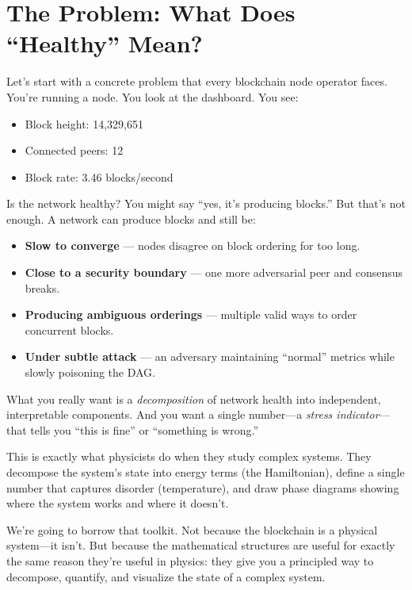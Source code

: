 \documentclass[11pt,a4paper]{article}
\begin{document}
\section{The Problem: What Does ``Healthy'' Mean?}

Let's start with a concrete problem that every blockchain node operator faces. You're running a node. You look at the dashboard. You see:

\begin{itemize}
    \item Block height: 14,329,651
    \item Connected peers: 12
    \item Block rate: 3.46 blocks/second
\end{itemize}

Is the network healthy? You might say ``yes, it's producing blocks.'' But that's not enough. A network can produce blocks and still be:

\begin{itemize}
    \item \textbf{Slow to converge} --- nodes disagree on block ordering for too long.
    \item \textbf{Close to a security boundary} --- one more adversarial peer and consensus breaks.
    \item \textbf{Producing ambiguous orderings} --- multiple valid ways to order concurrent blocks.
    \item \textbf{Under subtle attack} --- an adversary maintaining ``normal'' metrics while slowly poisoning the DAG.
\end{itemize}

What you really want is a \emph{decomposition} of network health into independent, interpretable components. And you want a single number---a \emph{stress indicator}---that tells you ``this is fine'' or ``something is wrong.''

This is exactly what physicists do when they study complex systems. They decompose the system's state into energy terms (the Hamiltonian), define a single number that captures disorder (temperature), and draw phase diagrams showing where the system works and where it doesn't.

We're going to borrow that toolkit. Not because the blockchain is a physical system---it isn't. But because the mathematical structures are useful for exactly the same reason they're useful in physics: they give you a principled way to decompose, quantify, and visualize the state of a complex system.
\end{document}
